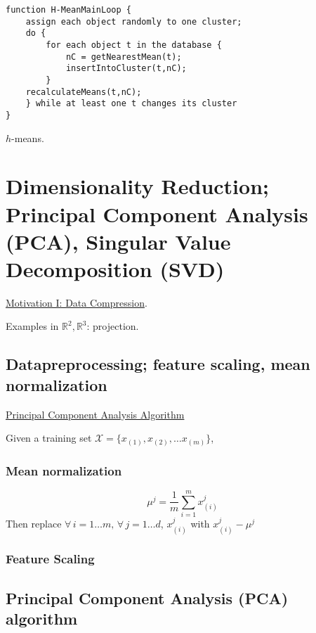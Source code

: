 \documentclass[10pt]{amsart}
\begin{document}
\begin{multicols*}{2}
\begin{lstlisting}
function H-MeanMainLoop {
	assign each object randomly to one cluster;
	do {
		for each object t in the database {
			nC = getNearestMean(t);
			insertIntoCluster(t,nC);
		}
	recalculateMeans(t,nC);
	} while at least one t changes its cluster
}
\end{lstlisting}
$h$-means.  




\section{Dimensionality Reduction; Principal Component Analysis (PCA), Singular Value Decomposition (SVD)}  

\href{https://www.coursera.org/learn/machine-learning/lecture/0EJ6A/motivation-i-data-compression}{Motivation I: Data Compression}.  

Examples in $\mathbb{R}^2, \mathbb{R}^3$: projection.  


\subsection{Datapreprocessing; feature scaling, mean normalization}

\href{https://www.coursera.org/learn/machine-learning/lecture/ZYIPa/principal-component-analysis-algorithm}{Principal Component Analysis Algorithm}

Given a training set $\mathcal{X} = \lbrace x_{(1)}, x_{(2)}, \dots x_{(m)} \rbrace$, 

\subsubsection{Mean normalization}

\begin{equation}
\mu^j = \frac{1}{m} \sum_{i=1}^m x^j_{(i)}
\end{equation}
Then replace $\forall \, i =1\dots m , \, \forall \, j = 1\dots d$, $x^j_{(i)}$ with $x^j_{(i)} - \mu^j$

\subsubsection{Feature Scaling}


\subsection{Principal Component Analysis (PCA) algorithm}


\end{multicols*}
\end{document}
